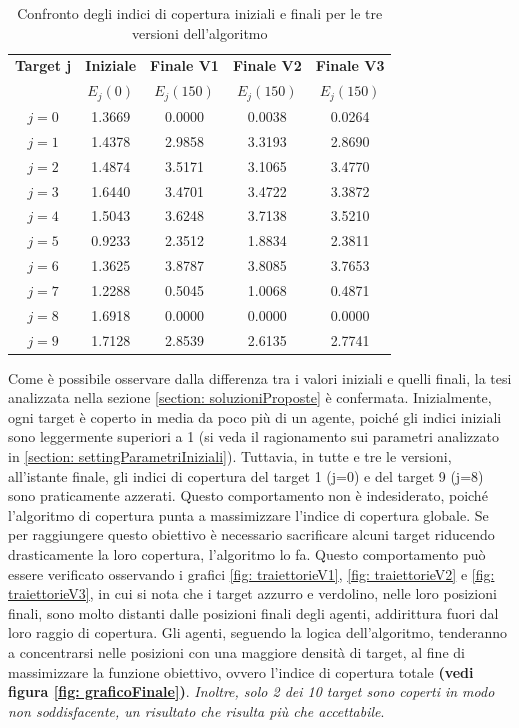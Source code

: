 \documentclass[twoside]{article}
\begin{document}
\begin{table}[H]
\centering
\begin{tabular}{ccccc}
\toprule
\textbf{Target j} & \textbf{Iniziale} & \textbf{Finale V1} & \textbf{Finale V2} & \textbf{Finale V3} \\
 & \(E_j(0)\) & \(E_j(150)\) & \(E_j(150)\) & \(E_j(150)\) \\
\midrule
\(j=0\) & 1.3669 & 0.0000 & 0.0038 & 0.0264 \\
\(j=1\) & 1.4378 & 2.9858 & 3.3193 & 2.8690 \\
\(j=2\) & 1.4874 & 3.5171 & 3.1065 & 3.4770 \\
\(j=3\) & 1.6440 & 3.4701 & 3.4722 & 3.3872 \\
\(j=4\) & 1.5043 & 3.6248 & 3.7138 & 3.5210 \\
\(j=5\) & 0.9233 & 2.3512 & 1.8834 & 2.3811 \\
\(j=6\) & 1.3625 & 3.8787 & 3.8085 & 3.7653 \\
\(j=7\) & 1.2288 & 0.5045 & 1.0068 & 0.4871 \\
\(j=8\) & 1.6918 & 0.0000 & 0.0000 & 0.0000 \\
\(j=9\) & 1.7128 & 2.8539 & 2.6135 & 2.7741 \\
\bottomrule
\end{tabular}
\caption{Confronto degli indici di copertura iniziali e finali per le tre versioni dell'algoritmo}
\label{tab:confronto-indici-copertura}
\end{table}

Come è possibile osservare dalla differenza tra i valori iniziali e quelli finali, la tesi analizzata nella sezione \ref{section: soluzioniProposte} è confermata. Inizialmente, ogni target è coperto in media da poco più di un agente, poiché gli indici iniziali sono leggermente superiori a 1 (si veda il ragionamento sui parametri analizzato in \ref{section: settingParametriIniziali}). Tuttavia, in tutte e tre le versioni, all'istante finale, gli indici di copertura del target 1 (j=0) e del target 9 (j=8) sono praticamente azzerati. Questo comportamento non è indesiderato, poiché l'algoritmo di copertura punta a massimizzare l'indice di copertura globale. Se per raggiungere questo obiettivo è necessario sacrificare alcuni target riducendo drasticamente la loro copertura, l'algoritmo lo fa. Questo comportamento può essere verificato osservando i grafici \ref{fig: traiettorieV1}, \ref{fig: traiettorieV2} e \ref{fig: traiettorieV3}, in cui si nota che i target azzurro e verdolino, nelle loro posizioni finali, sono molto distanti dalle posizioni finali degli agenti, addirittura fuori dal loro raggio di copertura. Gli agenti, seguendo la logica dell'algoritmo, tenderanno a concentrarsi nelle posizioni con una maggiore densità di target, al fine di massimizzare la funzione obiettivo, ovvero l'indice di copertura totale \textbf{(vedi figura \ref{fig: graficoFinale})}. \textit{Inoltre, solo 2 dei 10 target sono coperti in modo non soddisfacente, un risultato che risulta più che accettabile}.
\end{document}
